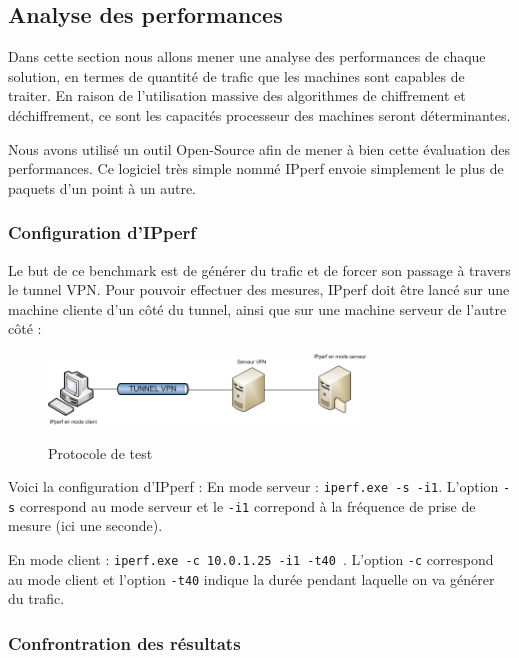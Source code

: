 \subsection{Analyse des performances}

Dans cette section nous allons mener une analyse des performances de chaque solution, en termes de quantité de trafic que les machines sont capables de traiter. En raison de l'utilisation massive des algorithmes de chiffrement et déchiffrement, ce sont les capacités processeur des machines seront déterminantes.

Nous avons utilisé un outil Open-Source afin de mener à bien cette évaluation des performances. Ce logiciel très simple nommé IPperf envoie simplement le plus de paquets d'un point à un autre.

\subsubsection{Configuration d'IPperf}

Le but de ce benchmark est de générer du trafic et de forcer son passage à travers le tunnel VPN. Pour pouvoir effectuer des mesures, IPperf doit être lancé sur une machine cliente d'un côté du tunnel, ainsi que sur une machine serveur de l'autre côté :

\begin{figure}[H]
	\begin{center}
		\includegraphics[width=0.75\textwidth]{partie_3/images/ipperf.png}\\
	\end{center}
	\caption{Protocole de test}
	\label{Protocole_de_test}
\end{figure}

Voici la configuration d'IPperf :
En mode serveur : \verb|iperf.exe -s -i1|. L'option \verb|-s| correspond au mode serveur et le \verb|-i1| correpond à la fréquence de prise de mesure (ici une seconde).

En mode client : \verb|iperf.exe -c 10.0.1.25 -i1 -t40 |. L'option \verb|-c| correspond au mode client et l'option \verb|-t40| indique la durée pendant laquelle on va générer du trafic.

\subsubsection{Confrontration des résultats}

